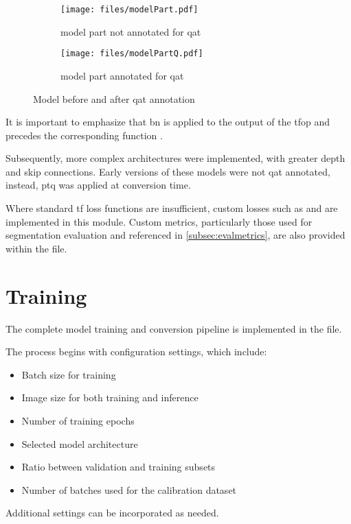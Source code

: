 {\begin{figure}[H]
  \centering
  \begin{subfigure}[t]{0.48\textwidth}
    \centering
    \texttt{[image: files/modelPart.pdf]}
    \caption{model part not annotated for \protect\gls{qat}}
  \end{subfigure}
  \hfill
  \begin{subfigure}[t]{0.48\textwidth}
    \centering
    \texttt{[image: files/modelPartQ.pdf]}
    \caption{model part annotated for \protect\gls{qat}}
  \end{subfigure}
  \caption{Model before and after \protect\gls{qat} annotation}
  \label{fig:quantnotquantcomp}
\end{figure}

It is important to emphasize that \gls{bn} is applied to the output of the  \gls{tfop} and precedes the corresponding  function \cite{batchnormActivation}.

Subsequently, more complex  architectures were implemented, with greater depth and skip connections.
Early versions of these models were not \gls{qat} annotated, instead, \gls{ptq} was applied at conversion time.

Where standard \gls{tf} loss functions are insufficient, custom losses such as  and  are implemented in this module.
Custom metrics, particularly those used for segmentation evaluation and referenced in \autoref{subsec:evalmetrics}, are also provided within the  file.

\section{Training}
\label{sec:training}

The complete model training and conversion pipeline is implemented in the  file.

The process begins with configuration settings, which include:
\begin{itemize}
\item Batch size for training
\item Image size for both training and inference
\item Number of training epochs
\item Selected model architecture
\item Ratio between validation and training subsets
\item Number of batches used for the calibration dataset
\end{itemize}
Additional settings can be incorporated as needed.

}
